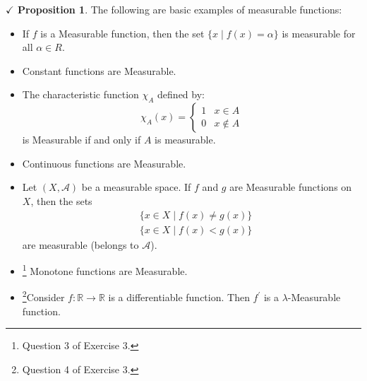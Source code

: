 \documentclass{article}
\theoremstyle{definition}
\theoremstyle{remark}
\theoremstyle{definition}
\theoremstyle{definition}
\newtheorem{proposition}{$\checkmark$ Proposition}
\theoremstyle{definition}
\newcommand{\where}{\;\vert\;}
\newcommand{\R}{\mathbb{R}}
\newcommand{\alg}[1]{\mathscr{#1}}
\begin{document}
\begin{proposition}
	\label{P-18}
	The following are basic examples of measurable functions:
	\begin{itemize}
		\item {If $ f $ is a Measurable function, then the set $ \{x\where f(x) = \alpha\} $ is measurable for all $ \alpha \in R $.}
		\item {Constant functions are Measurable.}
		\item {The characteristic function $ \chi_A $ defined by:
	\[\chi_A(x) = \begin{cases}
		1 & x\in A\\
		0 & x\notin A
	\end{cases}\]	
is Measurable if and only if $ A $ is measurable.	
}
\item {Continuous functions are Measurable.}
\item {Let $ (X,\alg{A}) $ be a measurable space. If $ f $ and $ g $ are Measurable functions on $ X $, then the sets
\begin{equation*}
	\begin{split}
		&\{x\in X\where f(x) \neq g(x)\}\\
		&\{x\in X\where f(x)< g(x)\}
	\end{split}
\end{equation*}
are measurable (belongs to $ \alg{A} $).
}
\item {\footnote{Question 3 of Exercise 3.} Monotone functions are Measurable.}
\item {\footnote{Question 4 of Exercise 3.}Consider $ f : \R \to \R $ is a differentiable function. Then $ f^{\prime} $ is a $ \lambda $-Measurable function.}
	\end{itemize}
\end{proposition}
\end{document}
